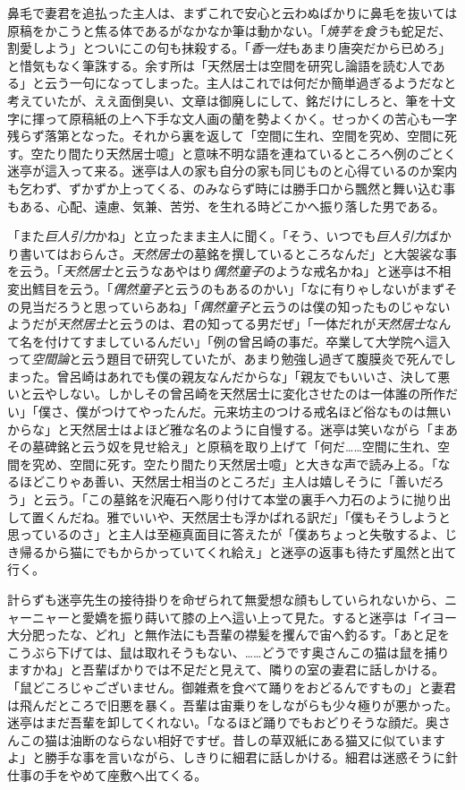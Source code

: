 \documentclass[12pt, openright]{book}
\begin{document}
鼻毛で妻君を追払った主人は、まずこれで安心と云わぬばかりに鼻毛を抜いては原稿をかこうと焦る体であるがなかなか筆は動かない。「\emph{焼芋を食う}も蛇足だ、割愛しよう」とついにこの句も抹殺する。「\emph{香一炷}もあまり唐突だから已めろ」と惜気もなく筆誅する。余す所は「天然居士は空間を研究し論語を読む人である」と云う一句になってしまった。主人はこれでは何だか簡単過ぎるようだなと考えていたが、ええ面倒臭い、文章は御廃しにして、銘だけにしろと、筆を十文字に揮って原稿紙の上へ下手な文人画の蘭を勢よくかく。せっかくの苦心も一字残らず落第となった。それから裏を返して「空間に生れ、空間を究め、空間に死す。空たり間たり天然居士噫」と意味不明な語を連ねているところへ例のごとく迷亭が這入って来る。迷亭は人の家も自分の家も同じものと心得ているのか案内も乞わず、ずかずか上ってくる、のみならず時には勝手口から飄然と舞い込む事もある、心配、遠慮、気兼、苦労、を生れる時どこかへ振り落した男である。

「また\emph{巨人引力}かね」と立ったまま主人に聞く。「そう、いつでも\emph{巨人引力}ばかり書いてはおらんさ。\emph{天然居士}の墓銘を撰しているところなんだ」と大袈裟な事を云う。「\emph{天然居士}と云うなあやはり\emph{偶然童子}のような戒名かね」と迷亭は不相変出鱈目を云う。「\emph{偶然童子}と云うのもあるのかい」「なに有りゃしないがまずその見当だろうと思っていらあね」「\emph{偶然童子}と云うのは僕の知ったものじゃないようだが\emph{天然居士}と云うのは、君の知ってる男だぜ」「一体だれが\emph{天然居士}なんて名を付けてすましているんだい」「例の曾呂崎の事だ。卒業して大学院へ這入って\emph{空間論}と云う題目で研究していたが、あまり勉強し過ぎて腹膜炎で死んでしまった。曾呂崎はあれでも僕の親友なんだからな」「親友でもいいさ、決して悪いと云やしない。しかしその曾呂崎を天然居士に変化させたのは一体誰の所作だい」「僕さ、僕がつけてやったんだ。元来坊主のつける戒名ほど俗なものは無いからな」と天然居士はよほど雅な名のように自慢する。迷亭は笑いながら「まあその墓碑銘と云う奴を見せ給え」と原稿を取り上げて「何だ\ldots{}\ldots{}空間に生れ、空間を究め、空間に死す。空たり間たり天然居士噫」と大きな声で読み上る。「なるほどこりゃあ善い、天然居士相当のところだ」主人は嬉しそうに「善いだろう」と云う。「この墓銘を沢庵石へ彫り付けて本堂の裏手へ力石のように抛り出して置くんだね。雅でいいや、天然居士も浮かばれる訳だ」「僕もそうしようと思っているのさ」と主人は至極真面目に答えたが「僕あちょっと失敬するよ、じき帰るから猫にでもからかっていてくれ給え」と迷亭の返事も待たず風然と出て行く。

計らずも迷亭先生の接待掛りを命ぜられて無愛想な顔もしていられないから、ニャーニャーと愛嬌を振り蒔いて膝の上へ這い上って見た。すると迷亭は「イヨー大分肥ったな、どれ」と無作法にも吾輩の襟髪を攫んで宙へ釣るす。「あと足をこうぶら下げては、鼠は取れそうもない、\ldots{}\ldots{}どうです奥さんこの猫は鼠を捕りますかね」と吾輩ばかりでは不足だと見えて、隣りの室の妻君に話しかける。「鼠どころじゃございません。御雑煮を食べて踊りをおどるんですもの」と妻君は飛んだところで旧悪を暴く。吾輩は宙乗りをしながらも少々極りが悪かった。迷亭はまだ吾輩を卸してくれない。「なるほど踊りでもおどりそうな顔だ。奥さんこの猫は油断のならない相好ですぜ。昔しの草双紙にある猫又に似ていますよ」と勝手な事を言いながら、しきりに細君に話しかける。細君は迷惑そうに針仕事の手をやめて座敷へ出てくる。
\end{document}
